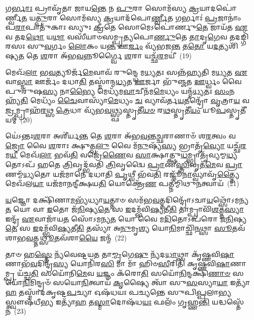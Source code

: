 𑌗\-\ul{𑌰𑍍𑌭𑌾𑌃} 𑌪𑍍𑌰𑌾𑌵𑍃᳴𑌤𑌾 𑌜𑌾𑌯\-\ul{𑌨𑍍𑌤𑍇} 𑌨 \ul{𑌪𑍁}\-𑌰𑌾 𑌸𑍋𑌮᳴𑌸𑍍𑌯 \ul{𑌕𑍍𑌰}\-𑌯𑌾𑌦𑌪𑍋॑𑌰𑍍𑌣𑍍𑌵𑍀\-\ul{𑌤} 𑌯\-\ul{𑌤𑍍𑌪𑍁}\-𑌰𑌾 𑌸𑍋𑌮᳴𑌸𑍍𑌯 \ul{𑌕𑍍𑌰}\-𑌯𑌾𑌦᳴𑌪𑍋\-\ul{𑌰𑍍𑌣𑍍𑌵𑍀}\-𑌤 𑌗𑌰𑍍𑌭𑌾𑌃॑ \ul{𑌪𑍍𑌰}\-𑌜𑌾𑌨𑌾𑌂॑ 𑌪\-\ul{𑌰𑌾}\-𑌪𑌾𑌤𑍁᳴𑌕𑌾𑌃 𑌸𑍍𑌯𑍁𑌃 \ul{𑌕𑍍𑌰𑍀}\-𑌤𑍇 𑌸𑍋𑌮𑍇\-𑌽𑌪𑍋॑𑌰𑍍𑌣𑍁\-\ul{𑌤𑍇} 𑌜𑌾𑌯᳴𑌤 \ul{𑌏}\-𑌵 𑌤𑌦\-\ul{𑌥𑍋} 𑌯\-\ul{𑌥𑌾} 𑌵𑌸𑍀᳴𑌯𑌾𑍞𑌸𑌮𑍍𑌪𑍍𑌰𑌤𑍍𑌯𑌪𑍋\-\ul{𑌰𑍍𑌣𑍁}\-𑌤𑍇 \ul{𑌤𑌾}\-𑌦𑍃\-\ul{𑌗𑍇}\-𑌵 𑌤𑌦𑌙𑍍𑌗𑌿᳴𑌰𑌸𑌃 𑌸𑍁\-\ul{𑌵}\-𑌰𑍍𑌗𑌂 \ul{𑌲𑍋}\-𑌕𑌂 𑌯\-\ul{𑌨𑍍𑌤} 𑌊\-\ul{𑌰𑍍𑌜𑌂} 𑌵𑍍𑌯᳴𑌭𑌜\-\ul{𑌨𑍍𑌤} 𑌤\-\ul{𑌤𑍋} 𑌯\-\ul{𑌦}\-𑌤𑍍𑌯𑌶𑌿᳴𑌷𑍍𑌯\-\ul{𑌤} 𑌤𑍇 \ul{𑌶}\-𑌰𑌾 𑌅᳴𑌭\-\ul{𑌵}\-𑌨𑍍𑌨𑍂𑌰𑍍𑌗𑍍𑌵𑍈 \ul{𑌶}\-𑌰𑌾 𑌯𑌚𑍍𑌛᳴\-\ul{𑌰}\-𑌮𑌯𑍀॑~(19)

𑌮𑍇𑌖᳴\-\ul{𑌲𑌾} 𑌭\-\ul{𑌵}\-𑌤𑍍𑌯𑍂𑌰𑍍𑌜᳴\-\ul{𑌮𑍇}\-𑌵𑌾𑌵᳴ 𑌰𑍁𑌨𑍍𑌦𑍍𑌧𑍇 𑌮\-\ul{𑌧𑍍𑌯}\-𑌤𑌃 𑌸𑌨𑍍𑌨᳴𑌹𑍍𑌯𑌤𑌿 𑌮\-\ul{𑌧𑍍𑌯}\-𑌤 \ul{𑌏}\-𑌵𑌾\-\ul{𑌸𑍍𑌮𑌾} 𑌊𑌰𑍍𑌜𑌂᳴ 𑌦𑌧𑌾\-\ul{𑌤𑌿} 𑌤𑌸𑍍𑌮𑌾॑𑌨𑍍𑌮\-\ul{𑌧𑍍𑌯}\-𑌤 \ul{𑌊}\-𑌰𑍍𑌜𑌾 𑌭𑍁᳴𑌞𑍍𑌜𑌤 \ul{𑌊}\-𑌰𑍍𑌧𑍍𑌵𑌂 𑌵𑍈 𑌪𑍁𑌰𑍁᳴𑌷\-\ul{𑌸𑍍𑌯} 𑌨𑌾\-\ul{𑌭𑍍𑌯𑍈} 𑌮𑍇𑌧𑍍𑌯᳴𑌮\-\ul{𑌵𑌾}\-𑌚𑍀𑌨᳴𑌮\-\ul{𑌮𑍇}\-𑌧𑍍𑌯𑌂 𑌯𑌨𑍍𑌮᳴\-\ul{𑌧𑍍𑌯}\-𑌤𑌃 \ul{𑌸𑌂}\-𑌨𑌹𑍍𑌯᳴\-\ul{𑌤𑌿} 𑌮𑍇𑌧𑍍𑌯𑌂᳴ \ul{𑌚𑍈}\-𑌵𑌾𑌸𑍍𑌯𑌾᳴\-\ul{𑌮𑍇}\-𑌧𑍍𑌯𑌂 \ul{𑌚} 𑌵𑍍𑌯𑌾𑌵᳴𑌰𑍍𑌤\-\ul{𑌯}\-𑌤𑍀𑌨𑍍𑌦𑍍𑌰𑍋᳴ \ul{𑌵𑍃}\-𑌤𑍍𑌰𑌾\-\ul{𑌯} 𑌵\-\ul{𑌜𑍍𑌰}\-𑌮𑍍𑌪𑍍𑌰𑌾𑌹᳴\-\ul{𑌰}\-𑌥𑍍𑌸 \ul{𑌤𑍍𑌰𑍇}\-𑌧𑌾 𑌵𑍍𑌯᳴𑌭\-\ul{𑌵}\-𑌥𑍍𑌸𑍍𑌫𑍍𑌯𑌸𑍍𑌤𑍃𑌤𑍀᳴\-\ul{𑌯}\-\-\ul{𑍞} 𑌰\-\ul{𑌥}\-𑌸𑍍𑌤𑍃𑌤𑍀᳴\-\ul{𑌯𑌂} 𑌯𑍂\-\ul{𑌪}\-𑌸𑍍𑌤𑍃𑌤𑍀᳴𑌯𑌮𑍍~(20)

𑌯𑍇॑\-𑌽𑌨𑍍𑌤𑌃\-\ul{𑌶}\-𑌰𑌾 𑌅𑌶𑍀॑𑌰𑍍𑌯\-\ul{𑌨𑍍𑌤} 𑌤𑍇 \ul{𑌶}\-𑌰𑌾 𑌅᳴𑌭\-\ul{𑌵}\-𑌨𑍍𑌤\-\ul{𑌚𑍍𑌛}\-𑌰𑌾𑌣𑌾𑍞᳴ 𑌶\-\ul{𑌰}\-𑌤𑍍𑌵𑌂 𑌵\-\ul{𑌜𑍍𑌰𑍋} 𑌵𑍈 \ul{𑌶}\-𑌰𑌾𑌃 𑌕𑍍𑌷𑍁𑌤𑍍𑌖\-\ul{𑌲𑍁} 𑌵𑍈 𑌮᳴\-\ul{𑌨𑍁}\-𑌷𑍍𑌯᳴\-\ul{𑌸𑍍𑌯} 𑌭𑍍𑌰𑌾𑌤𑍃᳴\-\ul{𑌵𑍍𑌯𑍋} 𑌯𑌚𑍍𑌛᳴\-\ul{𑌰}\-𑌮\-\ul{𑌯𑍀} 𑌮𑍇𑌖᳴\-\ul{𑌲𑌾} 𑌭𑌵᳴\-\ul{𑌤𑌿} 𑌵𑌜𑍍𑌰𑍇᳴\-\ul{𑌣𑍈}\-𑌵 \ul{𑌸𑌾}\-𑌕𑍍𑌷𑌾𑌤𑍍𑌕𑍍𑌷𑍁\-\ul{𑌧}\-𑌮𑍍𑌭𑍍𑌰𑌾𑌤𑍃᳴𑌵𑍍𑌯𑌮𑍍𑌮\-\ul{𑌧𑍍𑌯}\-𑌤𑍋\-𑌽𑌪᳴ 𑌹𑌤𑍇 \ul{𑌤𑍍𑌰𑌿}\-𑌵𑍃𑌦𑍍𑌭᳴𑌵𑌤𑌿 \ul{𑌤𑍍𑌰𑌿}\-𑌵𑍃𑌦𑍍𑌵𑍈 \ul{𑌪𑍍𑌰𑌾}\-𑌣\-\ul{𑌸𑍍𑌤𑍍𑌰𑌿}\-𑌵𑍃𑌤᳴\-\ul{𑌮𑍇}\-𑌵 \ul{𑌪𑍍𑌰𑌾}\-𑌣𑌮𑍍𑌮᳴\-\ul{𑌧𑍍𑌯}\-𑌤𑍋 𑌯𑌜᳴𑌮𑌾𑌨𑍇 𑌦𑌧𑌾𑌤𑌿 \ul{𑌪𑍃}\-𑌥𑍍𑌵𑍀 𑌭᳴𑌵\-\ul{𑌤𑌿} 𑌰𑌜𑍍𑌜𑍂᳴\-\ul{𑌨𑌾}\-𑌵𑍍𑌵𑍍𑌯𑌾𑌁𑌵𑍃᳴\-\ul{𑌤𑍍𑌤𑍍𑌯𑍈} 𑌮𑍇𑌖᳴𑌲\-\ul{𑌯𑌾} 𑌯𑌜᳴𑌮𑌾𑌨𑌨𑍍𑌦𑍀𑌕𑍍𑌷𑌯\-\ul{𑌤𑌿} 𑌯𑍋𑌕𑍍𑌤𑍍𑌰𑍇᳴\-\ul{𑌣} 𑌪𑌤𑍍𑌨𑍀॑𑌮𑍍𑌮𑌿𑌥𑍁\-\ul{𑌨}\-𑌤𑍍𑌵𑌾𑌯᳴~(21)

\-\ul{𑌯}\-𑌜𑍍𑌞𑍋 𑌦𑌕𑍍𑌷𑌿᳴𑌣𑌾\-\ul{𑌮}\-𑌭𑍍𑌯᳴𑌧𑍍𑌯𑌾\-\ul{𑌯}\-𑌤𑍍𑌤𑌾𑍞 𑌸𑌮᳴𑌭\-\ul{𑌵}\-𑌤𑍍𑌤𑌦𑌿𑌨𑍍𑌦𑍍𑌰𑍋᳴\-𑌽𑌚𑌾\-\ul{𑌯}\-𑌥𑍍𑌸𑍋᳴\-𑌽𑌮𑌨𑍍𑌯\-\ul{𑌤} 𑌯𑍋 𑌵𑌾 \ul{𑌇}\-𑌤𑍋 𑌜᳴\-\ul{𑌨𑌿}\-𑌷𑍍𑌯\-\ul{𑌤𑍇} 𑌸 \ul{𑌇}\-𑌦𑌮𑍍𑌭᳴𑌵𑌿\-\ul{𑌷𑍍𑌯}\-𑌤𑍀\-\ul{𑌤𑌿} 𑌤𑌾𑌮𑍍𑌪𑍍𑌰𑌾𑌵𑌿᳴\-\ul{𑌶}\-𑌤𑍍𑌤\-\ul{𑌸𑍍𑌯𑌾} 𑌇𑌨𑍍𑌦𑍍𑌰᳴ \ul{𑌏}\-𑌵𑌾𑌜𑌾᳴𑌯\-\ul{𑌤} 𑌸𑍋᳴\-𑌽𑌮𑌨𑍍𑌯\-\ul{𑌤} 𑌯𑍋 𑌵𑍈 𑌮\-\ul{𑌦𑌿}\-𑌤𑍋\-𑌽𑌪᳴𑌰𑍋 𑌜\-\ul{𑌨𑌿}\-𑌷𑍍𑌯\-\ul{𑌤𑍇} 𑌸 \ul{𑌇}\-𑌦𑌮𑍍𑌭᳴𑌵𑌿\-\ul{𑌷𑍍𑌯}\-𑌤𑍀\-\ul{𑌤𑌿} 𑌤𑌸𑍍𑌯𑌾᳴ 𑌅\-\ul{𑌨𑍁}\-𑌮𑍃\-\ul{𑌶𑍍𑌯} 𑌯𑍋\-\ul{𑌨𑌿}\-𑌮𑌾𑌚𑍍𑌛𑌿᳴\-\ul{𑌨}\-𑌥𑍍𑌸𑌾 \ul{𑌸𑍂}\-𑌤𑌵᳴𑌶𑌾𑌭\-\ul{𑌵}\-𑌤𑍍𑌤\-\ul{𑌥𑍍𑌸𑍂}\-𑌤𑌵᳴𑌶𑌾\-\ul{𑌯𑍈} 𑌜𑌨𑍍𑌮᳴~(22)

𑌤𑌾𑍞 𑌹\-\ul{𑌸𑍍𑌤𑍇} 𑌨𑍍𑌯᳴𑌵𑍇𑌷𑍍𑌟𑌯\-\ul{𑌤} 𑌤𑌾\-\ul{𑌮𑍍𑌮𑍃}\-𑌗𑍇\-\ul{𑌷𑍁} 𑌨𑍍𑌯᳴𑌦\-\ul{𑌧𑌾}\-𑌥𑍍𑌸𑌾 𑌕𑍃᳴𑌷𑍍𑌣𑌵𑌿\-\ul{𑌷𑌾}\-𑌣𑌾𑌭᳴\-\ul{𑌵}\-𑌦𑌿𑌨𑍍𑌦𑍍𑌰᳴\-\ul{𑌸𑍍𑌯} 𑌯𑍋𑌨𑌿᳴𑌰\-\ul{𑌸𑌿} 𑌮𑌾 𑌮𑌾᳴ 𑌹𑌿𑍞\-\ul{𑌸𑍀}\-𑌰𑌿𑌤𑌿᳴ 𑌕𑍃𑌷𑍍𑌣𑌵𑌿\-\ul{𑌷𑌾}\-𑌣𑌾𑌮𑍍𑌪𑍍𑌰 𑌯᳴𑌚𑍍𑌛\-\ul{𑌤𑌿} 𑌸𑌯𑍋᳴𑌨𑌿\-\ul{𑌮𑍇}\-𑌵 \ul{𑌯}\-𑌜𑍍𑌞𑌂 𑌕᳴𑌰𑍋\-\ul{𑌤𑌿} 𑌸𑌯𑍋᳴\-\ul{𑌨𑌿}\-𑌨𑍍𑌦𑌕𑍍𑌷𑌿᳴\-\ul{𑌣𑌾}\-\-\ul{𑍞} 𑌸𑌯𑍋᳴\-\ul{𑌨𑌿}\-𑌮𑌿𑌨𑍍𑌦𑍍𑌰𑍞᳴ 𑌸𑌯𑍋\-\ul{𑌨𑌿}\-𑌤𑍍𑌵𑌾𑌯᳴ \ul{𑌕𑍃}\-𑌷𑍍𑌯𑍈 𑌤𑍍𑌵𑌾᳴ 𑌸𑍁\-\ul{𑌸}\-𑌸𑍍𑌯𑌾\-\ul{𑌯𑌾} 𑌇𑌤𑍍𑌯𑌾᳴\-\ul{𑌹} 𑌤𑌸𑍍𑌮𑌾᳴𑌦𑌕𑍃𑌷𑍍𑌟\-\ul{𑌪}\-𑌚𑍍𑌯𑌾 𑌓𑌷᳴𑌧𑌯𑌃 𑌪𑌚𑍍𑌯𑌨𑍍𑌤𑍇 𑌸𑍁𑌪𑌿\-\ul{𑌪𑍍𑌪}\-𑌲𑌾\-\ul{𑌭𑍍𑌯}\-𑌸𑍍𑌤𑍍𑌵𑍗𑌷᳴𑌧𑍀\-\ul{𑌭𑍍𑌯} 𑌇𑌤𑍍𑌯𑌾᳴\-\ul{𑌹} 𑌤\-\ul{𑌸𑍍𑌮𑌾}\-𑌦𑍋𑌷᳴𑌧\-\ul{𑌯𑌃} 𑌫𑌲𑌂᳴ 𑌗𑍃𑌹𑍍𑌣\-\ul{𑌨𑍍𑌤𑌿} 𑌯𑌦𑍍𑌧𑌸𑍍𑌤𑍇᳴𑌨~(23)

